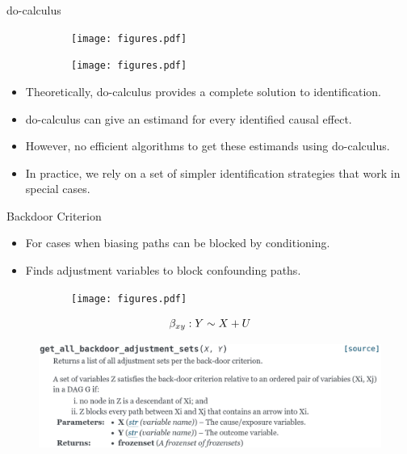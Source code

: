 \documentclass{beamer}
\begin{document}
\begin{frame}{do-calculus}
	\begin{figure}
		\begin{subfigure}{0.5 \textwidth}
			\centering
			\texttt{[image: figures.pdf]}
		\end{subfigure}%
		\begin{subfigure}{0.5 \textwidth}
			\centering
			\texttt{[image: figures.pdf]}
		\end{subfigure}
		\label{fig:idnent}
	\end{figure}

	\begin{itemize}
		\item Theoretically, do-calculus provides a complete solution to identification.
		\item do-calculus can give an estimand for every identified causal effect.
		\item However, no efficient algorithms to get these estimands using do-calculus.
		\item In practice, we rely on a set of simpler identification strategies that work in special cases.
	\end{itemize}
\end{frame}

\begin{frame}{Backdoor Criterion}
	\begin{itemize}
		\item For cases when biasing paths can be blocked by conditioning.
		\item Finds adjustment variables to block confounding paths.
	\end{itemize}
	\begin{figure}
		\begin{subfigure}{0.5\textwidth}
			\centering
			\texttt{[image: figures.pdf]}
		\end{subfigure}%
		\begin{subfigure}{0.5 \textwidth}
			\begin{equation*}
				\beta_{xy}: Y \sim X + U $$
			\end{equation*}
		\end{subfigure}
	\end{figure}

	\begin{figure}
		\centering
		\includegraphics[scale=0.25]{imgs/backdoor.png}
	\end{figure}

\end{frame}
\end{document}
